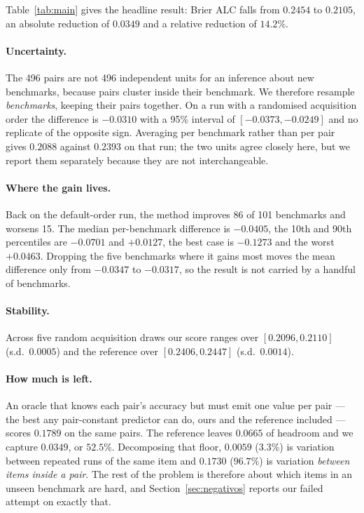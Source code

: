 \documentclass{article}
\begin{document}
Table~\ref{tab:main} gives the headline result: Brier ALC falls from $0.2454$ to
$0.2105$, an absolute reduction of $0.0349$ and a relative reduction of $14.2\%$.

\paragraph{Uncertainty.} The 496 pairs are not 496 independent units for an
inference about new benchmarks, because pairs cluster inside their benchmark. We
therefore resample \emph{benchmarks}, keeping their pairs together. On a run with
a randomised acquisition order the difference is $-0.0310$ with a 95\% interval
of $[-0.0373,-0.0249]$ and no replicate of the opposite sign. Averaging per
benchmark rather than per pair gives $0.2088$ against $0.2393$ on that run; the
two units agree closely here, but we report them separately because they are not
interchangeable.

\paragraph{Where the gain lives.} Back on the default-order run, the method
improves 86 of 101 benchmarks and
worsens 15. The median per-benchmark difference is $-0.0405$, the 10th and 90th
percentiles are $-0.0701$ and $+0.0127$, the best case is $-0.1273$ and the worst
$+0.0463$. Dropping the five benchmarks where it gains most moves the mean
difference only from $-0.0347$ to $-0.0317$, so the result is not carried by a
handful of benchmarks.

\paragraph{Stability.} Across five random acquisition draws our score ranges over
$[0.2096,0.2110]$ (s.d.\ $0.0005$) and the reference over $[0.2406,0.2447]$
(s.d.\ $0.0014$).

\paragraph{How much is left.} An oracle that knows each pair's accuracy but must
emit one value per pair --- the best any pair-constant predictor can do, ours and
the reference included --- scores $0.1789$ on the same pairs. The reference leaves
$0.0665$ of headroom and we capture $0.0349$, or $52.5\%$. Decomposing that floor,
$0.0059$ ($3.3\%$) is variation between repeated runs of the same item and
$0.1730$ ($96.7\%$) is variation \emph{between items inside a pair}. The rest of
the problem is therefore about which items in an unseen benchmark are hard, and
Section~\ref{sec:negativos} reports our failed attempt on exactly that.
\end{document}
